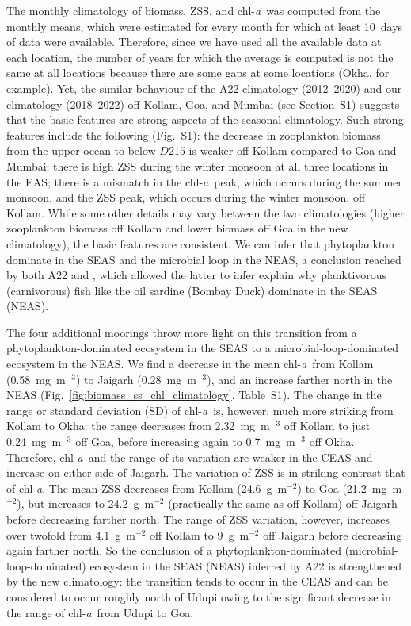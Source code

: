 \documentclass[authoryear,review,11pt]{elsarticle}
\newcommand{\chla}{chl-{\emph{a}}}
\begin{document}
The monthly climatology of biomass, ZSS, and \chla\ was computed from the monthly means, which were estimated for every month for which at least 10~days of data were available.  Therefore, since we have used all the available data at each location, the number of years for which the average is computed is not the same at all locations because there are some gaps at some locations (Okha, for example). Yet, the similar behaviour of the A22 climatology (2012--2020) and our climatology (2018--2022) off Kollam, Goa, and Mumbai (see Section~S1) suggests that the basic features are strong aspects of the seasonal climatology.  Such strong features include the following (Fig.~S1): the decrease in zooplankton biomass from the upper ocean to below $D215$ is weaker off Kollam compared to Goa and Mumbai; there is high ZSS during the winter monsoon at all three locations in the EAS; there is a mismatch in the \chla\ peak, which occurs during the summer monsoon, and the ZSS peak, which occurs during the winter monsoon, off Kollam.  While some other details may vary between the two climatologies (higher zooplankton biomass off Kollam and lower biomass off Goa in the new climatology), the basic features are consistent.  We can infer that phytoplankton dominate in the SEAS and the microbial loop in the NEAS, a conclusion reached by both A22 and \citet{shankar2019role}, which allowed the latter to infer explain why planktivorous (carnivorous) fish like the oil sardine (Bombay Duck) dominate in the SEAS (NEAS).

The four additional moorings throw more light on this transition from a phytoplankton-dominated ecosystem in the SEAS to a microbial-loop-dominated ecosystem in the NEAS.  We find a decrease in the mean \chla\ from Kollam (0.58~mg~m$^{-3}$) to Jaigarh (0.28~mg~m$^{-3}$), and an increase farther north in the NEAS (Fig.~\ref{fig:biomass_ss_chl_climatology}, Table~S1).  The change in the range or standard deviation (SD) of \chla\ is, however, much more striking from Kollam to Okha: the range decreases from 2.32~mg~m$^{-3}$ off Kollam to just 0.24~mg~m$^{-3}$ off Goa, before increasing again to 0.7~mg~m$^{-3}$ off Okha. Therefore, \chla\ and the range of its variation are weaker in the CEAS and increase on either side of Jaigarh.  The variation of ZSS is in striking contrast that of \chla.  The mean ZSS decreases from Kollam (24.6~g~m$^{-2}$) to Goa (21.2~mg~m$^{-2}$), but increases to 24.2~g~m$^{-2}$ (practically the same as off Kollam) off Jaigarh before decreasing farther north.  The range of ZSS variation, however, increases over twofold from 4.1~g~m$^{-2}$ off Kollam to 9~g~m$^{-2}$ off Jaigarh before decreasing again farther north. So the conclusion of a phytoplankton-dominated (microbial-loop-dominated) ecosystem in the SEAS (NEAS) inferred by A22 is strengthened by the new climatology: the transition tends to occur in the CEAS and can be considered to occur roughly north of Udupi owing to the significant decrease in the range of \chla\ from Udupi to Goa.
\end{document}
